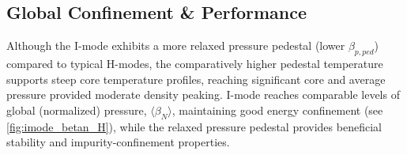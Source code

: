 \documentclass[ twoside,openright,titlepage,numbers=noenddot,headinclude,%
                footinclude=true,cleardoublepage=empty,abstractoff, %
                BCOR=5mm,paper=letter,fontsize=11pt,%
                ngerman,american,%
                ]{scrreprt}
\begin{document}
\subsection*{Global Confinement \& Performance}

Although the I-mode exhibits a more relaxed pressure pedestal (\ie lower $\beta_{p,ped}$) compared to typical H-modes, the comparatively higher pedestal temperature supports steep core temperature profiles, reaching significant core and average pressure provided moderate density peaking.  I-mode reaches comparable levels of global (normalized) pressure, $\langle \beta_N \rangle$, maintaining good energy confinement (see \cref{fig:imode_betan_H}), while the relaxed pressure pedestal provides beneficial stability and impurity-confinement properties.

\begin{figure}[p]
 \pushtooutside
\end{figure}
\end{document}
